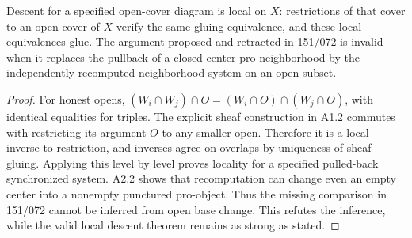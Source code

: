 \begin{result}\label{A2.3}
Descent for a specified open-cover diagram is local on $X$: restrictions
of that cover to an open cover of $X$ verify the same gluing equivalence,
and these local equivalences glue. The argument proposed and retracted
in 151/072 is invalid when it replaces the pullback of a closed-center
pro-neighborhood by the independently recomputed neighborhood system
on an open subset.
\end{result}
\begin{proof}
For honest opens, $(W_i\cap W_j)\cap O=(W_i\cap O)\cap(W_j\cap O)$,
with identical equalities for triples. The explicit sheaf construction
in A1.2 commutes with restricting its argument $O$ to any smaller open.
Therefore it is a local inverse to restriction, and inverses agree on
overlaps by uniqueness of sheaf gluing. Applying this level by level
proves locality for a specified pulled-back synchronized system.
A2.2 shows that recomputation can change even an empty center into a
nonempty punctured pro-object. Thus the missing comparison in 151/072
cannot be inferred from open base change. This refutes the inference,
while the valid local descent theorem remains as strong as stated.
\end{proof}

